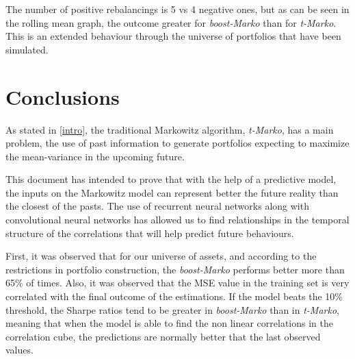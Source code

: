 \documentclass{article}
\begin{document}
The number of positive rebalancings is 5 vs 4 negative ones, but as can be seen in the rolling mean graph, the outcome greater for \textit{boost-Marko} than for \textit{t-Marko}. This is an extended behaviour through the universe of portfolios that have been simulated. 

\section{Conclusions}
As stated in \ref{intro}, the traditional Markowitz algorithm, \textit{t-Marko}, has a main problem, the use of past information to generate portfolios expecting to maximize the mean-variance in the upcoming future.

This document has intended to prove that with the help of a predictive model, the inputs on the Markowitz model can represent better the future reality than the closest of the pasts. The use of recurrent neural networks along with convolutional neural networks has allowed us to find relationships in the temporal structure of the correlations that will help predict future behaviours.

First, it was observed that for our universe of assets, and according to the restrictions in portfolio construction, the \textit{boost-Marko} performs better more than 65\% of times. Also, it was observed that the MSE value in the training set is very correlated with the final outcome of the estimations. If the model beats the 10\% threshold, the Sharpe ratios tend to be greater in \textit{boost-Marko} than in \textit{t-Marko}, meaning that when the model is able to find the non linear correlations in the correlation cube, the predictions are normally better that the last observed values.






\end{document}
